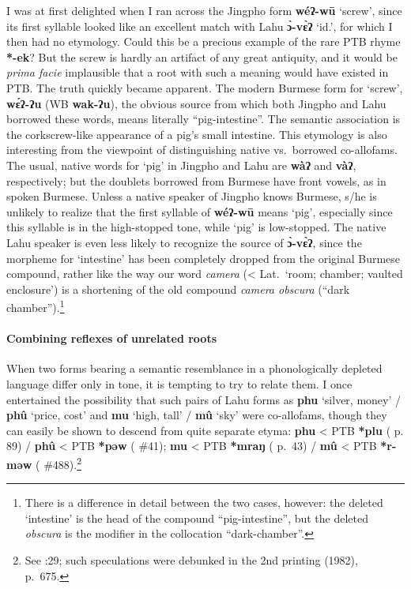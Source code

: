 I was at first delighted when I ran across the Jingpho form \textbf{wéʔ-wū} ‘screw’,
since its first syllable looked like an excellent match with Lahu \textbf{ɔ̀-vɛ̀ʔ} ‘id.’,
for which I then had no etymology. Could this be a precious example of the rare
PTB rhyme \textbf{*-ek}? But the screw is hardly an artifact of any great antiquity, and
it would be \textit{prima facie} implausible that a root with such a meaning would have
existed in PTB. The truth quickly became apparent. The modern Burmese form for
‘screw’, \textbf{wɛ́ʔ-ʔu} (WB \textbf{wak-ʔu}), the obvious source from which both Jingpho and
Lahu borrowed these words, means literally “pig-intestine”.  The semantic
association is the corkscrew-like appearance of a pig’s small intestine. This
etymology is also interesting from the viewpoint of distinguishing native vs.\
borrowed co-allofams. The usual, native words for ‘pig’ in Jingpho and Lahu are
\textbf{wàʔ} and \textbf{vàʔ}, respectively; but the doublets borrowed from Burmese have front
vowels, as in spoken Burmese. Unless a native speaker of Jingpho knows Burmese,
s/he is unlikely to realize that the first syllable of \textbf{wéʔ-wū} means ‘pig’,
especially since this syllable is in the high-stopped tone, while ‘pig’ is
low-stopped. The native Lahu speaker is even less likely to recognize the source
of \textbf{ɔ̀-vɛ̀ʔ}, since the morpheme for ‘intestine’ has been completely dropped from
the original Burmese compound, rather like the way our word \textit{camera} (< Lat.\
‘room; chamber; vaulted enclosure’) is a shortening of the old compound \textit{camera
obscura} (“dark chamber”).\footnote{There is a difference in detail between the
two cases, however: the deleted ‘intestine’ is the head of the compound
“pig-intestine”, but the deleted \textit{obscura} is the modifier in the collocation
“dark-chamber”.}

\paragraph{Combining reflexes of unrelated roots}

When two forms bearing a semantic resemblance in a phonologically depleted
language differ only in tone, it is tempting to try to relate them. I once
entertained the possibility that such pairs of Lahu forms as \textbf{phu} ‘silver, money’
/ \textbf{phû} ‘price, cost’ and \textbf{mu} ‘high, tall’ / \textbf{mû} ‘sky’ were co-allofams, though they
can easily be shown to descend from quite separate etyma: \textbf{phu} < PTB \textbf{*plu} (\textit{} p.
89) / \textbf{phû} < PTB \textbf{*pəw} (\textit{\citetalias{STC}} \#41);
\textbf{mu} < PTB \textbf{*mraŋ} (\textit{\citetalias{STC}} p.~43) / \textbf{mû} < PTB \textbf{*r-məw}
(\textit{\citetalias{STC}} \#488).\footnote{See \citealt{JAM-GL}:29; such speculations were debunked in
the 2nd printing (1982), p.~675.}

